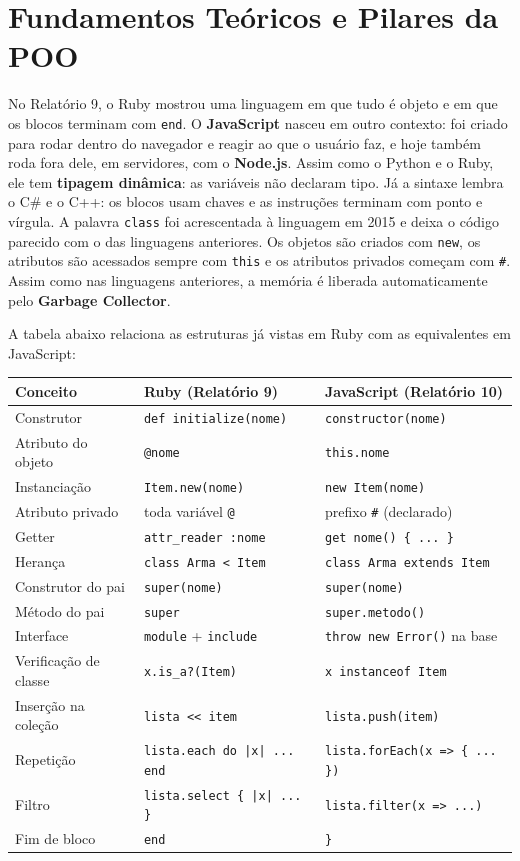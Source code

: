 \section{Fundamentos Teóricos e Pilares da POO}

No Relatório 9, o Ruby mostrou uma linguagem em que tudo é objeto e em que os blocos terminam
com \texttt{end}. O \textbf{JavaScript} nasceu em outro contexto: foi criado para rodar dentro do
navegador e reagir ao que o usuário faz, e hoje também roda fora dele, em servidores, com o
\textbf{Node.js}. Assim como o Python e o Ruby, ele tem \textbf{tipagem dinâmica}: as variáveis
não declaram tipo. Já a sintaxe lembra o C\# e o C++: os blocos usam chaves e as instruções
terminam com ponto e vírgula. A palavra \texttt{class} foi acrescentada à linguagem em 2015 e
deixa o código parecido com o das linguagens anteriores. Os objetos são criados com
\texttt{new}, os atributos são acessados sempre com \texttt{this} e os atributos privados
começam com \texttt{\#}. Assim como nas linguagens anteriores, a memória é liberada
automaticamente pelo \textbf{Garbage Collector}.

A tabela abaixo relaciona as estruturas já vistas em Ruby com as equivalentes em JavaScript:

\begin{center}
\begin{tabular}{|l|l|l|}
\hline
\textbf{Conceito} & \textbf{Ruby (Relatório 9)} & \textbf{JavaScript (Relatório 10)} \\
\hline
Construtor & \texttt{def initialize(nome)} & \texttt{constructor(nome)} \\
Atributo do objeto & \texttt{@nome} & \texttt{this.nome} \\
Instanciação & \texttt{Item.new(nome)} & \texttt{new Item(nome)} \\
Atributo privado & toda variável \texttt{@} & prefixo \texttt{\#} (declarado) \\
Getter & \texttt{attr\_reader :nome} & \texttt{get nome() \{ ... \}} \\
Herança & \texttt{class Arma < Item} & \texttt{class Arma extends Item} \\
Construtor do pai & \texttt{super(nome)} & \texttt{super(nome)} \\
Método do pai & \texttt{super} & \texttt{super.metodo()} \\
Interface & \texttt{module} + \texttt{include} & \texttt{throw new Error()} na base \\
Verificação de classe & \texttt{x.is\_a?(Item)} & \texttt{x instanceof Item} \\
Inserção na coleção & \texttt{lista <{}< item} & \texttt{lista.push(item)} \\
Repetição & \texttt{lista.each do |x| ... end} & \texttt{lista.forEach(x => \{ ... \})} \\
Filtro & \texttt{lista.select \{ |x| ... \}} & \texttt{lista.filter(x => ...)} \\
Fim de bloco & \texttt{end} & \texttt{\}} \\
\hline
\end{tabular}
\end{center}

